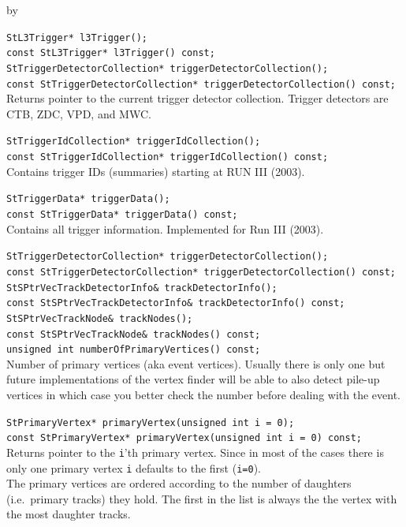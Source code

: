 \documentclass[twoside]{article}
\newcommand{\entrylabel}[1]{\mbox{\textbf{{#1}}}\hfil}%
\newenvironment{entry}
{\begin{list}{}%
    {\renewcommand{\makelabel}{\entrylabel}%
     \setlength{\labelwidth}{90pt}%
     \setlength{\leftmargin}{\labelwidth}
     \advance\leftmargin by \labelsep%
      }%
    }%
  {\end{list}}
\newcommand{\Entrylabel}[1]%
{\raisebox{0pt}[1ex][0pt]{\makebox[\labelwidth][l]%
    {\parbox[t]{\labelwidth}{\hspace{0pt}\textbf{{#1}}}}}}
\newenvironment{Entry}%
{\renewcommand{\entrylabel}{\Entrylabel}\begin{entry}}%
  {\end{entry}}
\begin{document}
\begin{Entry}
    \verb+StL3Trigger* l3Trigger();+\\
    \verb+const StL3Trigger* l3Trigger() const;+\\

    \verb+StTriggerDetectorCollection* triggerDetectorCollection();+\\
    \verb+const StTriggerDetectorCollection* triggerDetectorCollection() const;+\\
    Returns pointer to the current trigger detector collection.
    Trigger detectors are CTB, ZDC, VPD, and MWC.

    \verb+StTriggerIdCollection* triggerIdCollection();+\\
    \verb+const StTriggerIdCollection* triggerIdCollection() const;+\\
    Contains trigger IDs (summaries) starting at RUN III (2003).
    
    \verb+StTriggerData* triggerData();+\\
    \verb+const StTriggerData* triggerData() const;+\\
    Contains all trigger information. Implemented for Run III (2003).

    \verb+StTriggerDetectorCollection* triggerDetectorCollection();+\\
    \verb+const StTriggerDetectorCollection* triggerDetectorCollection() const;+\\
    
    \verb+StSPtrVecTrackDetectorInfo& trackDetectorInfo();+\\
    \verb+const StSPtrVecTrackDetectorInfo& trackDetectorInfo() const;+\\
    
    \verb+StSPtrVecTrackNode& trackNodes();+\\
    \verb+const StSPtrVecTrackNode& trackNodes() const;+\\
    
    \verb+unsigned int numberOfPrimaryVertices() const;+\\
    Number of primary vertices (aka event vertices).  Usually there is
    only one but future implementations of the vertex finder will be
    able to also detect pile-up vertices in which case you better
    check the number before dealing with the event.
    
    \verb+StPrimaryVertex* primaryVertex(unsigned int i = 0);+\\
    \verb+const StPrimaryVertex* primaryVertex(unsigned int i = 0) const;+\\
    Returns pointer to the \texttt{i}'th primary vertex.  Since in
    most of the cases there is only one primary vertex \texttt{i}
    defaults to the first (\texttt{i=0}).\\
    The primary vertices are ordered according to the number of daughters
    (i.e.~primary tracks) they hold. The first in the list is always the
    the vertex with the most daughter tracks.


\end{Entry}
\end{document}
